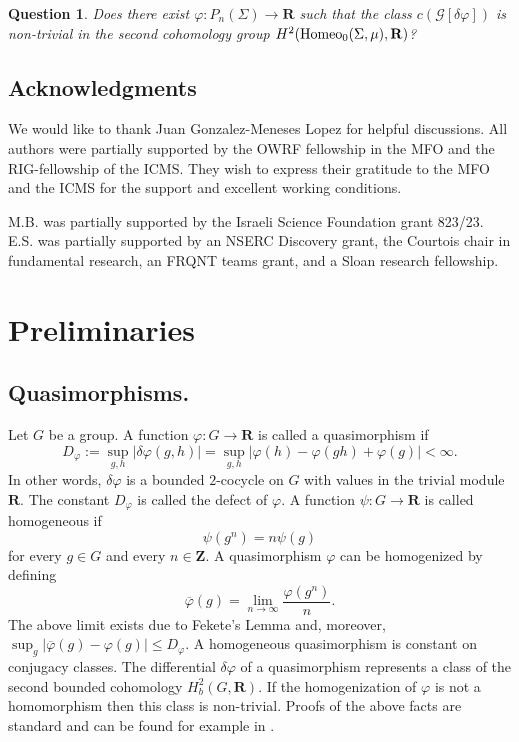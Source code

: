 \documentclass[11pt]{amsart}
\newtheorem{question}{Question}
\theoremstyle{definition}
\theoremstyle{remark}
\numberwithin{equation}{section}
\numberwithin{figure}{section}
\newcommand{\B}[1]{{\mathbf #1}}
\newcommand{\C}[1]{{\mathcal #1}}
\begin{document}
\begin{question}
Does there exist $\varphi\colon P_n(\Sigma)\to \B R$ such that the
class $c(\C G[\delta\varphi])$ is non-trivial 
in the second cohomology group $H^2({\rm Homeo}_0(\Sigma,\mu),\B R)$?
\end{question}

\subsection*{Acknowledgments}
We would like to thank Juan Gonzalez-Meneses Lopez for helpful discussions.
All authors were partially supported by the OWRF fellowship in the MFO and the
RIG-fellowship of the ICMS. They wish to express their gratitude to the MFO and the ICMS for the support and excellent working conditions.

M.B. was partially supported by the Israeli Science Foundation grant 823/23.
E.S. was partially supported by an NSERC Discovery grant, the Courtois chair in fundamental research, an FRQNT teams grant, and a Sloan research fellowship.

\section{Preliminaries}\label{S:preliminaries}

\subsection*{Quasimorphisms.} Let $G$ be a group. A function $\varphi\colon G\to \B R$
is called a quasimorphism if
$$
D_{\varphi}:=\sup_{g,h}|\delta\varphi(g,h)| = \sup_{g,h}|\varphi(h) - \varphi(gh) + \varphi(g)| < \infty.
$$
In other words, $\delta\varphi$ is a bounded $2$-cocycle on $G$ with values in the
trivial module $\B R$. The constant $D_{\varphi}$ is called the defect of $\varphi$.
A function $\psi\colon G\to \B R$ is called homogeneous if 
$$
\psi(g^n)=n\psi(g)
$$
for every $g\in G$ and every $n\in \B Z$. A quasimorphism $\varphi$ can be homogenized 
by defining 
$$
\overline{\varphi}(g) = \lim_{n\to \infty}\frac{\varphi(g^n)}{n}.
$$
The above limit exists due to Fekete's Lemma and, moreover,
$\sup_g |\overline{\varphi}(g)-\varphi(g)|\leq D_{\varphi}$.
A homogeneous quasimorphism is constant on conjugacy classes. 
The differential $\delta\varphi$ of a quasimorphism represents a class of
the second bounded cohomology $H^2_b(G,\B R)$. If the homogenization of $\varphi$ 
is not a homomorphism then this class is non-trivial. 
Proofs of the above
facts are standard and can be found for example in \cite{zbMATH05577332}.\\
\end{document}
